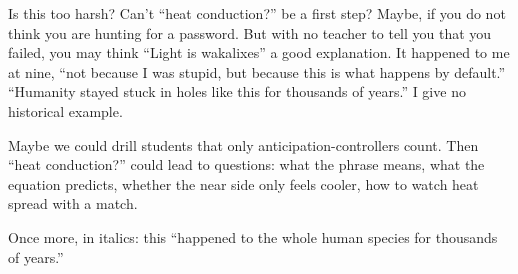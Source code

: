 Is this too harsh? Can't ``heat conduction?'' be a first step? Maybe, if you do not think you are hunting for a password. But with no teacher to tell you that you failed, you may think ``Light is wakalixes'' a good explanation.  It happened to me at nine, ``not because I was stupid, but because this is what happens by default.'' ``Humanity stayed stuck in holes like this for thousands of years.'' I give no historical example.

Maybe we could drill students that only anticipation-controllers count. Then ``heat conduction?'' could lead to questions: what the phrase means, what the equation predicts, whether the near side only feels cooler, how to watch heat spread with a match.

Once more, in italics: this ``happened to the whole human species for thousands of years.''
